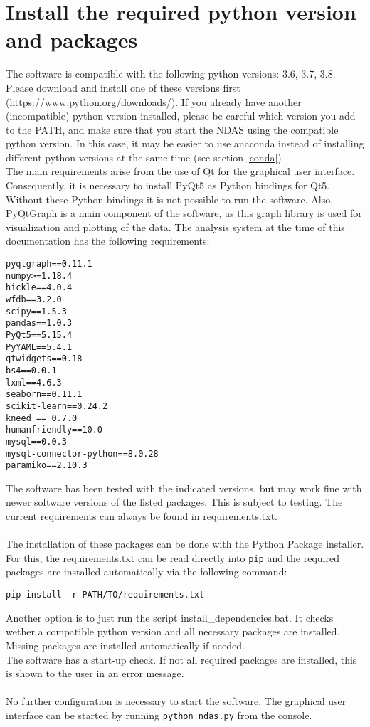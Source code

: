 \section{Install the required python version and packages}
The software is compatible with the following python versions: 3.6, 3.7, 3.8. Please download and install one of these versions first (\url{https://www.python.org/downloads/}).
If you already have another (incompatible) python version installed, please be careful which version you add to the PATH, and make sure that you start the NDAS using the compatible python version. In this case, it may be easier to use anaconda instead of installing different python versions at the same time (see section \ref{conda})
\\
The main requirements arise from the use of Qt for the graphical user interface. Consequently, it is necessary to install PyQt5 as Python bindings for Qt5. Without these Python bindings it is not possible to run the software. Also, PyQtGraph is a main component of the software, as this graph library is used for visualization and plotting of the data. The analysis system at the time of this documentation has the following requirements: 
\begin{lstlisting}[caption=requirements.txt: Current requirements for the analysis software.]
pyqtgraph==0.11.1
numpy>=1.18.4
hickle==4.0.4
wfdb==3.2.0
scipy==1.5.3
pandas==1.0.3
PyQt5==5.15.4
PyYAML==5.4.1
qtwidgets==0.18
bs4==0.0.1
lxml==4.6.3
seaborn==0.11.1
scikit-learn==0.24.2
kneed == 0.7.0
humanfriendly==10.0
mysql==0.0.3
mysql-connector-python==8.0.28
paramiko==2.10.3
\end{lstlisting}
The software has been tested with the indicated versions, but may work fine with newer software versions of the listed packages. This is subject to testing. The current requirements can always be found in requirements.txt.\\
\\
The installation of these packages can be done with the Python Package installer. For this, the requirements.txt can be read directly into \texttt{pip} and the required packages are installed automatically via the following command:
\begin{lstlisting}[caption=Installation of requirements from the requirements.txt.]
pip install -r PATH/TO/requirements.txt
\end{lstlisting}

Another option is to just run the script install\_dependencies.bat. It checks wether a compatible python version and all necessary packages are installed. Missing packages are installed automatically if needed.
\\
The software has a start-up check. If not all required packages are installed, this is shown to the user in an error message.\\
\\
No further configuration is necessary to start the software. The graphical user interface can be started by running \texttt{python ndas.py} from the console.

